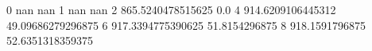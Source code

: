 0 nan nan
1 nan nan
2 865.5240478515625 0.0
4 914.6209106445312 49.09686279296875
6 917.3394775390625 51.8154296875
8 918.1591796875 52.6351318359375
